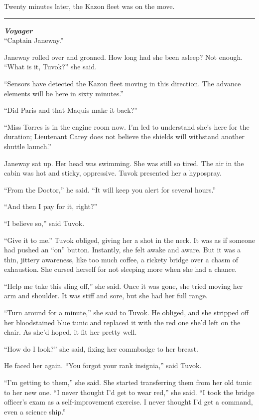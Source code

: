 \documentclass[twoside,letterpaper,12pt]{memoir}
\begin{document}
Twenty minutes later, the Kazon fleet was on the move.

\fancybreak{\rule{3cm}{0.4 pt}}
\noindent\textit{\textbf{Voyager}}\\

``Captain Janeway.''

Janeway rolled over and groaned. How long had she been asleep? Not enough. ``What is it, Tuvok?'' she said.

``Sensors have detected the Kazon fleet moving in this direction. The advance elements will be here in sixty minutes.''

``Did Paris and that Maquis make it back?''

``Miss Torres is in the engine room now. I'm led to understand she's here for the duration; Lieutenant Carey does not believe the shields will withstand another shuttle launch.''

Janeway sat up. Her head was swimming. She was still so tired. The air in the cabin was hot and sticky, oppressive. Tuvok presented her a hypospray.

``From the Doctor,'' he said. ``It will keep you alert for several hours.''

``And then I pay for it, right?''

``I believe so,'' said Tuvok.

``Give it to me.'' Tuvok obliged, giving her a shot in the neck. It was as if someone had pushed an ``on'' button. Instantly, she felt awake and aware. But it was a thin, jittery awareness, like too much coffee, a rickety bridge over a chasm of exhaustion. She cursed herself for not sleeping more when she had a chance.

``Help me take this sling off,'' she said. Once it was gone, she tried moving her arm and shoulder. It was stiff and sore, but she had her full range.

``Turn around for a minute,'' she said to Tuvok. He obliged, and she stripped off her bloodstained blue tunic and replaced it with the red one she'd left on the chair. As she'd hoped, it fit her pretty well.

``How do I look?'' she said, fixing her commbadge to her breast.

He faced her again. ``You forgot your rank insignia,'' said Tuvok.

``I'm getting to them,'' she said. She started transferring them from her old tunic to her new one. ``I never thought I'd get to wear red,'' she said. ``I took the bridge officer's exam as a self-improvement exercise. I never thought I'd get a command, even a science ship.''
\end{document}

